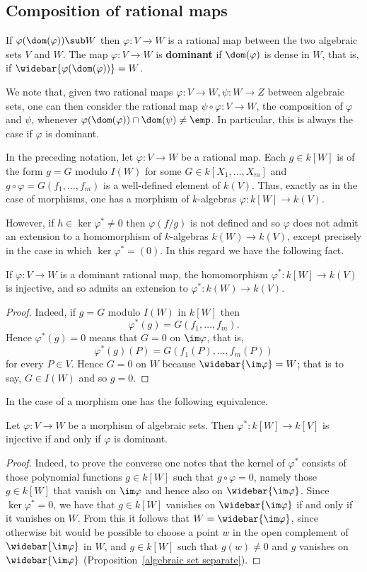 \subsection{Composition of rational maps}
\begin{definition}
If $\varphi(\dom(\varphi))\sub W$ then $\varphi:V\to W$ is a rational map between the two algebraic sets $V$ and $W$. The map $\varphi:V\to W$ is \textbf{dominant} if $\dom(\varphi)$ is dense in $W$, that is, if $\widebar{\varphi(\dom(\varphi))}=W$.
\end{definition}
We note that, given two rational maps $\varphi:V\to W,\psi:W\to Z$ between algebraic sets, one can then consider the rational map $\psi\circ\varphi:V\to W$, the composition of $\varphi$ and $\psi$, whenever $\varphi(\dom(\varphi))\cap\dom(\psi)\neq\emp$. In particular, this is always the case if $\varphi$ is dominant.\par
In the preceding notation, let $\varphi:V\to W$ be a rational map. Each $g\in k[W]$ is of the form $g=G$ modulo $I(W)$ for some $G\in k[X_1,\dots,X_m]$ and $g\circ\varphi=G(f_1,\dots,f_m)$ is a well-defined element of $k(V)$. Thus, exactly as in the case of morphisms, one has a morphism of $k$-algebras $\varphi:k[W]\to k(V)$.\par
However, if $h\in\ker\varphi^*\neq 0$ then $\varphi(f/g)$ is not defined and so $\varphi$ does not admit an extension to a homomorphism of $k$-algebras $k(W)\to k(V)$, except precisely in the case in which $\ker\varphi^*=(0)$. In this regard we have the following fact.
\begin{proposition}
If $\varphi:V\to W$ is a dominant rational map, the homomorphism $\varphi^*:k[W]\to k(V) $ is injective, and so admits an extension to $\varphi^*:k(W)\to k(V)$.
\end{proposition}
\begin{proof}
Indeed, if $g=G$ modulo $I(W)$ in $k[W]$ then
\[\varphi^*(g)=G(f_1,\dots,f_m).\]
Hence $\varphi^*(g)=0$ means that $G=0$ on $\im\varphi$, that is,
\[\varphi^*(g)(P)=G(f_1(P),\dots,f_m(P))\]
for every $P\in V$. Hence $G=0$ on $W$ because $\widebar{\im\varphi}=W$; that is to say, $G\in I(W)$ and so $g=0$.
\end{proof}
In the case of a morphism one has the following equivalence.
\begin{lemma}
Let $\varphi:V\to W$ be a morphism of algebraic sets. Then $\varphi^*:k[W]\to k[V]$ is injective if and only if $\varphi$ is dominant.
\end{lemma}
\begin{proof}
Indeed, to prove the converse one notes that the kernel of $\varphi^*$ consists of those polynomial functions $g\in k[W]$ such that $g\circ\varphi=0$, namely those $g\in k[W]$ that vanish on $\im\varphi$ and hence also on $\widebar{\im\varphi}$. Since $\ker\varphi^*=0$, we have that $g\in k[W]$ vanishes on $\widebar{\im\varphi}$ if and only if it vanishes on $W$. From this it follows that $W=\widebar{\im\varphi}$, since otherwise bit would be possible to choose a point $w$ in the open complement of $\widebar{\im\varphi}$ in $W$, and $g\in k[W]$ such that $g(w)\neq0$ and $g$ vanishes on $\widebar{\im\varphi}$ (Proposition~\ref{algebraic set separate}).
\end{proof}
